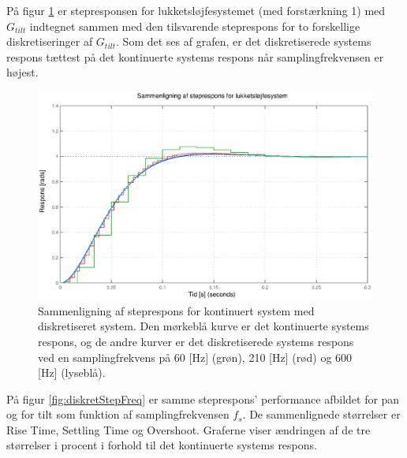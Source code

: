 På figur \ref{fig:diskretTiltStep} er stepresponsen for lukketsløjfesystemet (med forstærkning 1)
med \(G_{tilt}\) indtegnet sammen med den tilsvarende steprespons for to forskellige diskretiseringer
af \(G_{tilt}\). Som det ses af grafen, er det diskretiserede systems respons tættest
på det kontinuerte systems respons når samplingfrekvensen er højest.
\begin{figure}[!th]
\centering
	\includegraphics[width=1\textwidth]{./graphics/diskretTiltStep.eps}
\caption[Sammenligning af steprespons for kontinuert system med diskretiseret system]
{Sammenligning af steprespons for kontinuert system med diskretiseret system.
Den mørkeblå kurve er det kontinuerte systems respons,
og de andre kurver er det diskretiserede systems respons ved en samplingfrekvens på
60 [Hz] (grøn), 210 [Hz] (rød) og 600 [Hz] (lyseblå).}
\label{fig:diskretTiltStep}
\end{figure}
På figur \ref{fig:diskretStepFreq} er samme steprespons' performance afbildet
for pan og for tilt som funktion af samplingfrekvensen \(f_s\).
De sammenlignede størrelser er Rise Time, Settling Time og Overshoot.
Graferne viser ændringen af de tre størrelser i procent i forhold til det kontinuerte systems respons.
